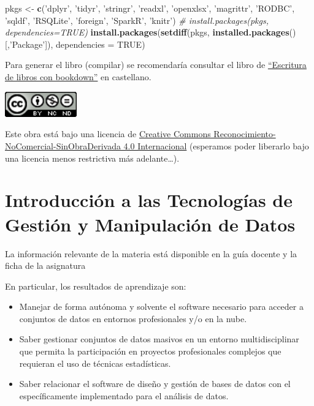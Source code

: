 \documentclass[]{book}
\newenvironment{Shaded}{\begin{snugshade}}{\end{snugshade}}
\newcommand{\CommentTok}[1]{\textcolor[rgb]{0.56,0.35,0.01}{\textit{#1}}}
\newcommand{\DataTypeTok}[1]{\textcolor[rgb]{0.13,0.29,0.53}{#1}}
\newcommand{\KeywordTok}[1]{\textcolor[rgb]{0.13,0.29,0.53}{\textbf{#1}}}
\newcommand{\NormalTok}[1]{#1}
\newcommand{\OtherTok}[1]{\textcolor[rgb]{0.56,0.35,0.01}{#1}}
\newcommand{\StringTok}[1]{\textcolor[rgb]{0.31,0.60,0.02}{#1}}
\begin{document}
\begin{Shaded}
\begin{Highlighting}[]
\NormalTok{pkgs <-}\StringTok{ }\KeywordTok{c}\NormalTok{(}\StringTok{'dplyr'}\NormalTok{, }\StringTok{'tidyr'}\NormalTok{, }\StringTok{'stringr'}\NormalTok{, }\StringTok{'readxl'}\NormalTok{, }\StringTok{'openxlsx'}\NormalTok{, }\StringTok{'magrittr'}\NormalTok{, }
          \StringTok{'RODBC'}\NormalTok{, }\StringTok{'sqldf'}\NormalTok{, }\StringTok{'RSQLite'}\NormalTok{, }\StringTok{'foreign'}\NormalTok{, }\StringTok{'SparkR'}\NormalTok{, }\StringTok{'knitr'}\NormalTok{)}
\CommentTok{# install.packages(pkgs, dependencies=TRUE)}
\KeywordTok{install.packages}\NormalTok{(}\KeywordTok{setdiff}\NormalTok{(pkgs, }\KeywordTok{installed.packages}\NormalTok{()[,}\StringTok{'Package'}\NormalTok{]), }\DataTypeTok{dependencies =} \OtherTok{TRUE}\NormalTok{)}
\end{Highlighting}
\end{Shaded}

Para generar el libro (compilar) se recomendaría consultar el libro de \href{https://rubenfcasal.github.io/bookdown_intro}{``Escritura de libros con bookdown''} en castellano.

\includegraphics[width=1.22in]{images/by-nc-nd-88x31}

Este obra está bajo una licencia de \href{https://creativecommons.org/licenses/by-nc-nd/4.0/deed.es_ES}{Creative Commons Reconocimiento-NoComercial-SinObraDerivada 4.0 Internacional}
(esperamos poder liberarlo bajo una licencia menos restrictiva más adelante\ldots{}).

\hypertarget{introduccion-a-las-tecnologias-de-gestion-y-manipulacion-de-datos}{%
\chapter{Introducción a las Tecnologías de Gestión y Manipulación de Datos}\label{introduccion-a-las-tecnologias-de-gestion-y-manipulacion-de-datos}}

La información relevante de la materia está disponible en la guía docente y la ficha de la asignatura

En particular, los resultados de aprendizaje son:

\begin{itemize}
\item
  Manejar de forma autónoma y solvente el software necesario para acceder a conjuntos de datos en entornos profesionales y/o en la nube.
\item
  Saber gestionar conjuntos de datos masivos en un entorno multidisciplinar que permita la participación en proyectos profesionales complejos que requieran el uso de técnicas estadísticas.
\item
  Saber relacionar el software de diseño y gestión de bases de datos con el específicamente implementado para el análisis de datos.
\end{itemize}
\end{document}
